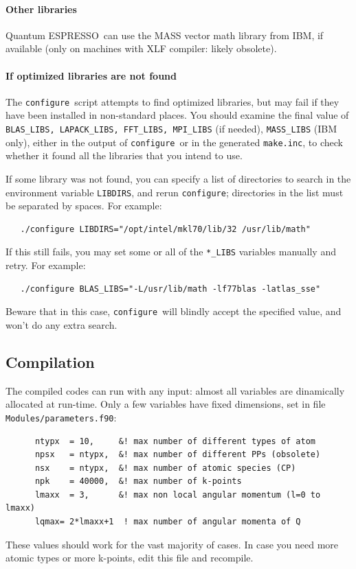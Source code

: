 \documentclass[12pt,a4paper]{article}
\def\qe{{\sc Quantum ESPRESSO}}
\def\configure{\texttt{configure}}
\begin{document}
\paragraph{Other libraries}
\qe\ can use the MASS vector math
library from IBM, if available (only on machines with XLF compiler:
likely obsolete).

\paragraph{If optimized libraries are not found}
The \configure\ script attempts to find optimized libraries, but may fail
if they have been installed in non-standard places. You should examine
the final value of \texttt{BLAS\_LIBS, LAPACK\_LIBS, FFT\_LIBS, MPI\_LIBS} (if needed),
\texttt{MASS\_LIBS} (IBM only), either in the output of \configure\ or in the generated
\texttt{make.inc}, to check whether it found all the libraries that you intend to use.

If some library was not found, you can specify a list of directories to search
in the environment variable \texttt{LIBDIRS},
and rerun \configure; directories in the
list must be separated by spaces. For example:
\begin{verbatim}
   ./configure LIBDIRS="/opt/intel/mkl70/lib/32 /usr/lib/math"
\end{verbatim}
If this still fails, you may set some or all of the \texttt{*\_LIBS} variables manually
and retry. For example:
\begin{verbatim}
   ./configure BLAS_LIBS="-L/usr/lib/math -lf77blas -latlas_sse"
\end{verbatim}
Beware that in this case, \configure\ will blindly accept the specified value,
and won't do any extra search.

\subsection{Compilation}
\label{SubSec:Compilation}

The compiled codes can run with any input: almost all variables are
dinamically allocated at run-time. Only a few variables have fixed
dimensions, set in file \texttt{Modules/parameters.f90}:
\begin{verbatim}
      ntypx  = 10,     &! max number of different types of atom
      npsx   = ntypx,  &! max number of different PPs (obsolete)
      nsx    = ntypx,  &! max number of atomic species (CP)
      npk    = 40000,  &! max number of k-points
      lmaxx  = 3,      &! max non local angular momentum (l=0 to lmaxx)
      lqmax= 2*lmaxx+1  ! max number of angular momenta of Q
\end{verbatim}
These values should work for the vast majority of cases. In case you need
more atomic types or more k-points, edit this file and recompile.
\end{document}
